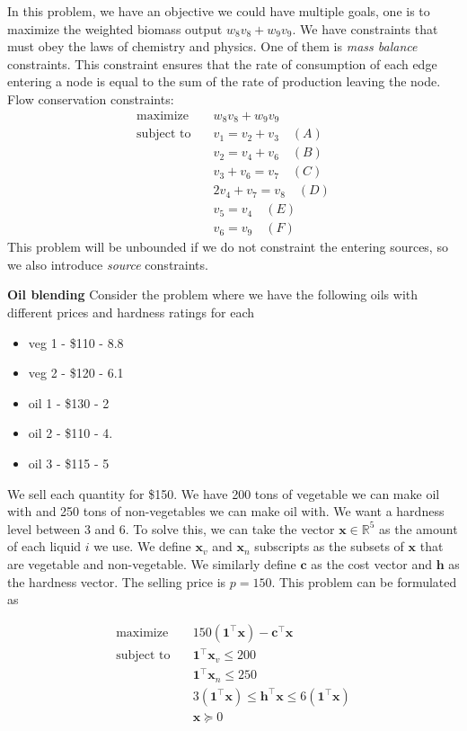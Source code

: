 In this problem, we have an objective we could have multiple goals, one is to maximize the weighted biomass output $w_8 v_8 + w_9 v_9$.
We have constraints that must obey the laws of chemistry and physics. One of them is \textit{mass balance} constraints.
This constraint ensures that the rate of consumption of each edge entering a node is equal to the sum of the rate of production leaving the node.
Flow conservation constraints:
\begin{align}
  \text{maximize} & \quad w_8 v_8 + w_9 v_9 \\
  \text{subject to} & \quad v_1 = v_2 + v_3 \quad (A)\\
  & \quad v_2 = v_4 + v_6 \quad (B)\\
  & \quad v_3 + v_6 = v_7 \quad (C)\\
  & \quad 2v_4 + v_7 = v_8 \quad (D)\\
  & \quad v_5 = v_4 \quad (E)\\
  & \quad v_6 = v_9 \quad (F)
\end{align} 
This problem will be unbounded if we do not constraint the entering sources, so we also introduce \textit{source} constraints.

\textbf{Oil blending}
Consider the problem where we have the following oils with different prices and hardness ratings for each
\begin{itemize}
    \item veg 1 - \$110 - 8.8
    \item veg 2 - \$120 - 6.1
    \item oil 1 - \$130 - 2
    \item oil 2 - \$110 - 4.
    \item oil 3 - \$115 - 5
\end{itemize}
We sell each quantity for \$150.
We have 200 tons of vegetable we can make oil with and 250 tons of non-vegetables we can make oil with.
We want a hardness level between 3 and 6.
To solve this, we can take the vector $\textbf{x} \in \mathbb{R}^5$ as the amount of each liquid $i$ we use. 
We define $\textbf{x}_v$ and $\textbf{x}_n$ subscripts as the subsets of $\textbf{x}$ that are vegetable and non-vegetable.
We similarly define $\textbf{c}$ as the cost vector and $\textbf{h}$ as the hardness vector.
The selling price is $p=150$.
This problem can be formulated as

\begin{align}
  \text{maximize} & \quad 150 (\textbf{1}^\top \textbf{x}) - \textbf{c}^\top \textbf{x} \\
  \text{subject to} & \quad \textbf{1}^\top \textbf{x}_v \leq 200\\
  & \quad \textbf{1}^\top \textbf{x}_n \leq 250 \\
  & \quad 3 (\textbf{1}^\top \textbf{x}) \leq \textbf{h}^\top \textbf{x} \leq 6 (\textbf{1}^\top \textbf{x}) \\
  & \quad \textbf{x} \succeq 0
\end{align}